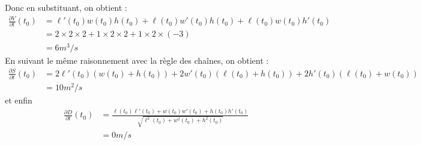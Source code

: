 {\begin{enumerate}
{		
		Donc en substituant, on obtient :
		\begin{align*}
		\frac{\partial V}{\partial t}(t_0) &= \ell'(t_0)w(t_0)h(t_0) + \ell(t_0)w'(t_0)h(t_0)+\ell(t_0)w(t_0)h'(t_0) \\
		&= 2 \times 2 \times 2 + 1 \times 2 \times 2 + 1 \times 2 \times (-3)\\
		&= 6m^3/s
		\end{align*}
		En suivant le même raisonnement avec la règle des chaînes, on obtient :
		\begin{align*}
		\frac{\partial S}{\partial t}(t_0) &= 2\ell'(t_0)(w(t_0)+h(t_0)) +  2w'(t_0)(\ell(t_0)+h(t_0)) + 2h'(t_0)(\ell(t_0)+w(t_0)) \\
		&= 10m^2/s
		\end{align*}
		et enfin
		\begin{align*}
		\frac{\partial D}{\partial t}(t_0) &= \frac{\ell(t_0)\ell'(t_0)+w(t_0)w'(t_0)+h(t_0)h'(t_0)}{\sqrt{\ell^2(t_0)+w^2(t_0)+h^2(t_0)}} \\
		&= 0m/s
		\end{align*}
	}
\end{enumerate}}
